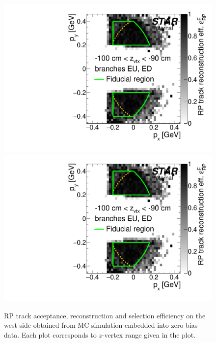 \begin{figure}[hb]
\caption[RP track acceptance, reconstruction and selection efficiency on the west (MC embedded into zero-bias data).]{RP track acceptance, reconstruction and selection efficiency on the west side obtained from MC simulation embedded into zero-bias data. Each plot corresponds to $z$-vertex range given in the plot.}\label{fig:rpEffE}
\centering
\parbox{0.495\textwidth}{
  \centering
  \includegraphics[width=\linewidth,page=23]{graphics/corrections/mcFullEffPxPy.pdf}\\
  \includegraphics[width=\linewidth,page=25]{graphics/corrections/mcFullEffPxPy.pdf}\\
}
\end{figure}
